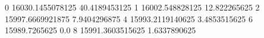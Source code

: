 0 16030.1455078125 40.4189453125
1 16002.548828125 12.822265625
2 15997.6669921875 7.9404296875
4 15993.2119140625 3.4853515625
6 15989.7265625 0.0
8 15991.3603515625 1.6337890625
